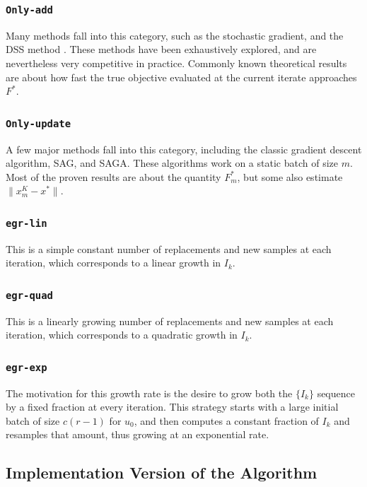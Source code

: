 \documentclass[11pt]{article}
\begin{document}
\subsubsection{\texttt{Only-add}}

Many methods fall into this category, such as the stochastic gradient, and the DSS method \cite{dss}. These methods have been exhaustively explored, and are nevertheless very competitive in practice. Commonly known theoretical results are about how fast the true objective evaluated at the current iterate approaches $F^*$.

\subsubsection{\texttt{Only-update}}

A few major methods fall into this category, including the classic gradient descent algorithm, SAG, and  SAGA. These algorithms work on a static batch of size $m$. Most of the proven results are about the quantity $F^*_m$, but some also estimate $\|  x^K_m - x^*\|$.

\subsubsection{\texttt{egr-lin}}

This is a simple constant number of replacements and new samples at each iteration, which corresponds to a linear growth in $I_k$.

\subsubsection{\texttt{egr-quad}}
This is a linearly growing number of replacements and new samples at each iteration, which corresponds to a quadratic growth in $I_k$.

\subsubsection{\texttt{egr-exp}}

The motivation for this growth rate is the desire to grow both the $\{I_k\}$ sequence by a fixed fraction at every iteration. This strategy starts with a large initial batch of size $c(r-1)$ for $u_0$, and then computes a constant fraction of $I_k$ and resamples that amount, thus growing at an exponential rate. 
 
\subsection{Implementation Version of the Algorithm}
\end{document}
